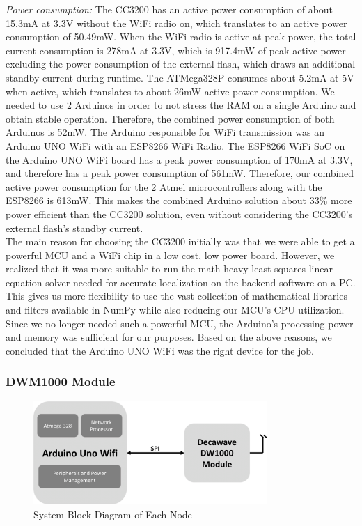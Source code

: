 \documentclass[journal,transmag]{IEEEtran}
\begin{document}
\textit{Power consumption:}
The CC3200 has an active power consumption of about 15.3mA at 3.3V without the WiFi radio on, which translates to an active power consumption of 50.49mW. When the WiFi radio is active at peak power, the total current consumption is 278mA at 3.3V, which is 917.4mW of peak active power excluding the power consumption of the external flash, which draws an additional standby current during runtime.
The ATMega328P consumes about 5.2mA at 5V when active, which translates to about 26mW active power consumption.  We needed to use 2 Arduinos in order to not stress the RAM on a single Arduino and obtain stable operation.  Therefore, the combined power consumption of both Arduinos is 52mW.  The Arduino responsible for WiFi transmission was an Arduino UNO WiFi with an ESP8266 WiFi Radio. The ESP8266 WiFi SoC on the Arduino UNO WiFi board has a peak power consumption of 170mA at 3.3V, and therefore has a peak power consumption of 561mW.  Therefore, our combined active power consumption for the 2 Atmel microcontrollers along with the ESP8266 is 613mW.  This makes the combined Arduino solution about 33\% more power efficient than the CC3200 solution, even without considering the CC3200's external flash's standby current. \\

The main reason for choosing the CC3200 initially was that we were able to get a powerful MCU and a WiFi chip in a low cost, low power board.  However, we realized that it was more suitable to run the math-heavy least-squares linear equation solver needed for accurate localization on the backend software on a PC.  This gives us more flexibility to use the vast collection of mathematical libraries and filters available in NumPy while also reducing our MCU's CPU utilization.  Since we no longer needed such a powerful MCU, the Arduino's processing power and memory was sufficient for our purposes.  Based on the above reasons, we concluded that the Arduino UNO WiFi was the right device for the job.\\

\subsubsection{DWM1000 Module}





\begin{figure}[!h]
\centering
\includegraphics[width=3.5in]{nodebd.png}
\caption{{System Block Diagram of Each Node}}
\label{EACHNODEBD}
\end{figure}
\end{document}
